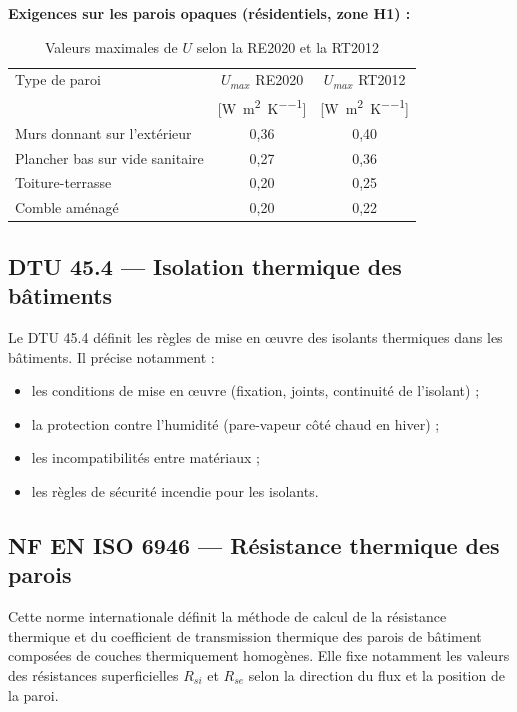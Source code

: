 \textbf{Exigences sur les parois opaques (résidentiels, zone H1) :}

\begin{table}[H]
  \centering
  \caption{Valeurs maximales de $U$ selon la RE2020 et la RT2012}
  \begin{tabular}{lcc}
    \toprule
    Type de paroi & \(U_{max}\) RE2020 & \(U_{max}\) RT2012 \\
                  & [\si{\watt\per\meter\squared\per\kelvin}] & [\si{\watt\per\meter\squared\per\kelvin}] \\
    \midrule
    Murs donnant sur l'extérieur & 0,36 & 0,40 \\
    Plancher bas sur vide sanitaire & 0,27 & 0,36 \\
    Toiture-terrasse & 0,20 & 0,25 \\
    Comble aménagé & 0,20 & 0,22 \\
    \bottomrule
  \end{tabular}
\end{table}

\subsection{DTU 45.4 — Isolation thermique des bâtiments}

Le DTU 45.4 définit les règles de mise en œuvre des isolants thermiques dans les bâtiments.
Il précise notamment :
\begin{itemize}
  \item les conditions de mise en œuvre (fixation, joints, continuité de l'isolant) ;
  \item la protection contre l'humidité (pare-vapeur côté chaud en hiver) ;
  \item les incompatibilités entre matériaux ;
  \item les règles de sécurité incendie pour les isolants.
\end{itemize}

\subsection{NF EN ISO 6946 — Résistance thermique des parois}

Cette norme internationale définit la méthode de calcul de la résistance thermique et du
coefficient de transmission thermique des parois de bâtiment composées de couches
thermiquement homogènes. Elle fixe notamment les valeurs des résistances superficielles
\(R_{si}\) et \(R_{se}\) selon la direction du flux et la position de la paroi.

